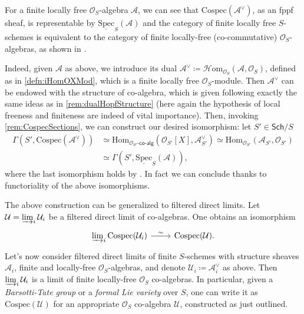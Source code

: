 \begin{rem}[]
	For a finite locally free $\mathcal{O}_{ S }$-algebra $\mathcal{A}$,
	we can see that $\mathrm{Cospec}(\mathcal{A}^{\vee})$, as an fppf sheaf, is representable 
	by $\underline{\mathrm{Spec}}_S(\mathcal{A})$ and
	the category of finite locally free $S$-schemes
	is equivalent to the category of finite locally-free (co-commutative)
	$\mathcal{O}_{ S }$-algebras, as shown in 
	\cite[Chapter III, remark 2.1.2]{Messing}.

	Indeed, given $\mathcal{A}$ as above, we introduce its dual
	$\mathcal{A}^{\vee} \coloneqq \mathcal{H}\mathrm{om}_{\mathcal{O}_{ S }} 
	\left( \mathcal{A}, \mathcal{O}_{ S } \right)$,
	defined as in \cref{defn:iHomOXMod}, which is a
	finite locally free $\mathcal{O}_{ S }$-module.
	Then $\mathcal{A}^{\vee}$ can be endowed with the structure of co-algebra, which is
	given following exactly the same ideas as in \cref{rem:dualHopfStructure}
	(here again the hypothesis of local freeness and finiteness are indeed
	of vital importance).
	Then, invoking \cref{rem:CospecSections}, we can construct 
	our desired isomorphism: let $S' \in \mathsf{Sch}/S$
	\begin{align*}
		\Gamma(S', \mathrm{Cospec}(\mathcal{A}^{\vee})) &\simeq
		\mathrm{Hom}_{ \mathcal{O}_{ S' }\text{-}\mathsf{co}\text{-}\mathsf{alg}} 
		\left( \mathcal{O}_{ S' }[X], \mathcal{A}^\vee_{S'} \right) \simeq
		\mathrm{Hom}_{ \mathcal{O}_{ S' }}
		\left( \mathcal{A}_{S'}, \mathcal{O}_{ S' } \right) \\
		&\simeq
		\Gamma(S', \underline{\mathrm{Spec}}_S(\mathcal{A}))
	,\end{align*}
	where the last isomorphism holds by 
	\cite[\href{https://stacks.math.columbia.edu/tag/01LV}{Lemma 01LV}]{SP}.
	In fact we can conclude thanks to functoriality of the above isomorphisms.
\end{rem}


\begin{rem}
	The above construction can be generalized to
	filtered direct limits.
	Let $\mathcal{U} = \varinjlim_i \mathcal{U}_i$ be a filtered direct limit
	of co-algebras. One obtains an isomorphism
	\begin{equation*}
	\begin{tikzcd}[row sep = 0ex
		,/tikz/column 1/.append style={anchor=base east}
		,/tikz/column 2/.append style={anchor=base west}]
		\varinjlim_i \mathrm{Cospec}(\mathcal{U}_i) \arrow[r, "\sim", rightarrow] &
		\mathrm{Cospec}(\mathcal{U})
	.\end{tikzcd}
	\end{equation*} 
	Let's now consider filtered direct limits of 
	finite $S$-schemes with structure sheaves $\mathcal{A}_i$,
	finite and locally-free $\mathcal{O}_{ S }$-algebras, 
	and denote $\mathcal{U}_i \coloneqq \mathcal{A}_i^\vee$ as above.
	Then $\varinjlim_i \mathcal{U}_i$ is a limit 
	of finite locally-free $\mathcal{O}_{ S }$ co-algebras.
	In particular, given a {\em Barsotti-Tate group} or a {\em formal Lie variety}
	over $S$, one can write it as $\mathrm{Cospec}(\mathcal{U})$ for an appropriate 
	$\mathcal{O}_{ S }$ co-algebra $\mathcal{U}$, constructed as just outlined.
\end{rem}


